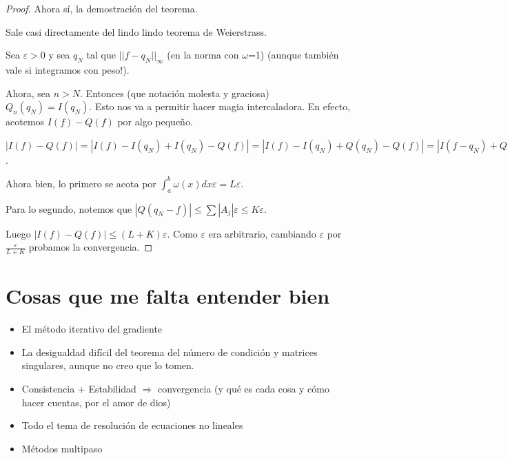 \documentclass[10pt,a4paper,final]{report}
\begin{document}
\begin{proof}
	Ahora sí, la demostración del teorema.
	
	Sale casi directamente del lindo lindo teorema de Weierstrass.
	
	Sea $\varepsilon > 0$ y sea $q_N$ tal que $||f-q_N||_\infty$ (en la norma con $\omega$=1) (aunque también vale si integramos con peso!).
	
	Ahora, sea $n> N$. Entonces (que notación molesta y graciosa) $Q_n(q_N) = I(q_N)$. Esto nos va a permitir hacer magia intercaladora. En efecto, acotemos $I(f)-Q(f)$ por algo pequeño.
	
	$|I(f)-Q(f)|=|I(f)-I(q_N) + I(q_N) - Q(f)|=|I(f)-I(q_N) + Q(q_N) - Q(f)|=|I(f-q_N)+ Q(q_N-f)|\leq |I(f-q_N)| + |Q(q_N-f)|$.
	
	Ahora bien, lo primero se acota por $\int_a^b \omega(x)dx \varepsilon= L \varepsilon$.
	
	Para lo segundo, notemos que $|Q(q_N-f)| \leq \sum |A_j| \varepsilon \leq K \varepsilon$.
	
	Luego $|I(f)-Q(f)| \leq (L+K)\varepsilon$. Como $\varepsilon$ era arbitrario, cambiando $\varepsilon$ por $\frac{\varepsilon}{L+K}$ probamos la convergencia.
\end{proof}

\section{Cosas que me falta entender bien}
\begin{itemize}
	\item El método iterativo del gradiente
	\item La desigualdad difícil del teorema del número de condición y matrices singulares, aunque no creo que lo tomen.
	\item Consistencia + Estabilidad $\Rightarrow$ convergencia (y qué es cada cosa y cómo hacer cuentas, por el amor de dios)
	\item Todo el tema de resolución de ecuaciones no lineales
	\item Métodos multipaso
\end{itemize}
\end{document}
